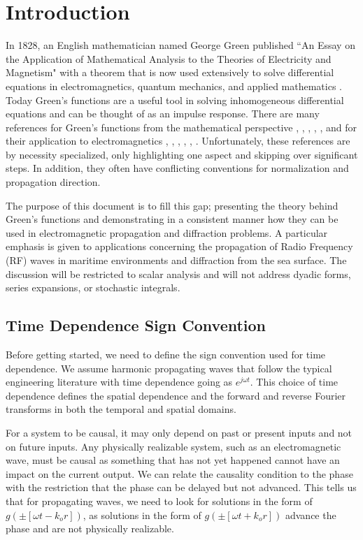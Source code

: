 \section{Introduction}
In 1828, an English mathematician named George Green published ``An Essay on the Application of Mathematical Analysis to the Theories of Electricity and Magnetism" with a theorem that is now used extensively to solve differential equations in electromagnetics, quantum mechanics, and applied mathematics \cite{green_phys_today}. Today Green's functions are a useful tool in solving inhomogeneous differential equations and can be thought of as an impulse response. There are many references for Green's functions from the mathematical perspective \cite{bender_orszag}, \cite{arfken_weber}, \cite{gbur_math}, \cite{guenther_partial_de}, \cite{duffy_green}, and for their application to electromagnetics \cite{jackson_classical_em}, \cite{zangwill_modern_em}, \cite{balanis_advanced}, \cite{goodman_fourier}, \cite{smith_radiation}, \cite{schwinger_em}. Unfortunately, these references are by necessity specialized, only highlighting one aspect and skipping over significant steps. In addition, they often have conflicting conventions for normalization and propagation direction. 

The purpose of this document is to fill this gap; presenting the theory behind Green's functions and demonstrating in a consistent manner how they can be used in electromagnetic propagation and diffraction problems. A particular emphasis is given to applications concerning the propagation of Radio Frequency (RF) waves in maritime environments and diffraction from the sea surface. The discussion will be restricted to scalar analysis and will not address dyadic forms, series expansions, or stochastic integrals.

\subsection{Time Dependence Sign Convention} \label{gf_sec:time_dependence}
Before getting started, we need to define the sign convention used for time dependence. We  assume harmonic propagating waves that follow the typical engineering literature with time dependence going as $e^{j\omega t}$. This choice of time dependence defines the spatial dependence and the forward and reverse Fourier transforms in both the temporal and spatial domains.

For a system to be causal, it may only depend on past or present inputs and not on future inputs. Any physically realizable system, such as an electromagnetic wave, must be causal as something that has not yet happened cannot have an impact on the current output. We can relate the causality condition to the phase with the restriction that the phase can be delayed but not advanced. This tells us that for propagating waves, we need to look for solutions in the form of $g\left(\pm\left[\omega t - k_or\right]\right)$, as solutions in the form of $g\left(\pm\left[\omega t + k_or\right]\right)$ advance the phase and are not physically realizable. 

